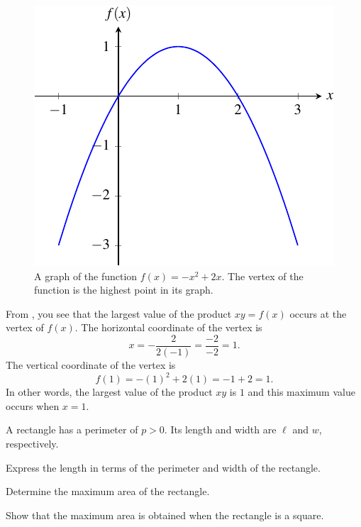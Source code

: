 \documentclass[a4paper,oneside,12pt]{article}
\begin{document}
\begin{problem}
{\begin{solution}
\begin{figure}[!htbp]
\centering
\includegraphics[scale=1.2]{image/09/largest-product.pdf}
\caption{%
  A graph of the function $f(x) = -x^2 + 2x$.  The vertex of the
  function is the highest point in its graph.
}
\label{fig:largest_product_xy}
\end{figure}

From , you see that the largest value
of the product $xy = f(x)$ occurs at the vertex of $f(x)$.  The
horizontal coordinate of the vertex is
\[
x
=
-\frac{2}{2(-1)}
=
\frac{-2}{-2}
=
1.
\]
The vertical coordinate of the vertex is
\[
f(1)
=
-(1)^2 + 2(1)
=
-1 + 2
=
1.
\]
In other words, the largest value of the product $xy$ is $1$ and this
maximum value occurs when $x = 1$.
\end{solution}
}{}

\item A rectangle has a perimeter of $p > 0$.  Its length and width
  are $\ell$ and $w$, respectively.
  \begin{packedenum}
  \item\label{subprob:rectangle_length_w_p}
    Express the length in terms of the perimeter and width of the
    rectangle.

  \item\label{subprob:rectangle_maximum_area}
    Determine the maximum area of the rectangle.

  \item\label{subprob:rectangle_maximum_area_is_square}
    Show that the maximum area is obtained when the rectangle is a
    square.
  \end{packedenum}
\end{problem}
\end{document}

